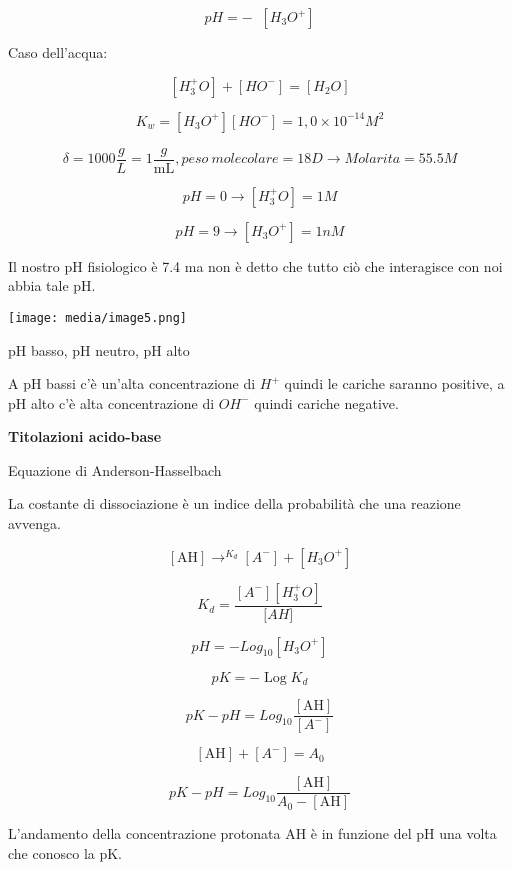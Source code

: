 \[pH = - \operatorname{}\left\lbrack H_{3}O^{+} \right\rbrack\]

Caso dell'acqua:

\[\left\lbrack H_{3}^{+}O \right\rbrack + \left\lbrack HO^{-} \right\rbrack = \left\lbrack H_{2}O \right\rbrack\]

\[K_{w} = \left\lbrack H_{3}O^{+} \right\rbrack\left\lbrack HO^{-} \right\rbrack = 1,0 \times 10^{- 14}M^{2}\]

\[\delta = 1000\frac{g}{L} = 1\frac{g}{\text{mL}},peso\ molecolare = 18D \rightarrow Molarita = 55.5M\]

\[pH = 0 \rightarrow \left\lbrack H_{3}^{+}O \right\rbrack = 1M\]

\[pH = 9 \rightarrow \left\lbrack H_{3}O^{+} \right\rbrack = 1nM\]

Il nostro pH fisiologico è 7.4 ma non è detto che tutto ciò che
interagisce con noi abbia tale pH.

\texttt{[image: media/image5.png]}

pH basso, pH neutro, pH alto

A pH bassi c'è un'alta concentrazione di \(H^{+}\) quindi le cariche
saranno positive, a pH alto c'è alta concentrazione di \(OH^{-}\) quindi
cariche negative.

\textbf{Titolazioni acido-base}

Equazione di Anderson-Hasselbach

La costante di dissociazione è un indice della probabilità che una
reazione avvenga.

\[\left\lbrack \text{AH} \right\rbrack \rightarrow^{K_{d}}\left\lbrack A^{-} \right\rbrack + \left\lbrack H_{3}O^{+} \right\rbrack\]

\[K_{d} = \frac{\left\lbrack A^{-} \right\rbrack\left\lbrack H_{3}^{+}O \right\rbrack}{\lbrack AH\rbrack}\]

\[pH = - Log_{10}\left\lbrack H_{3}O^{+} \right\rbrack\]

\[pK = - \operatorname{Log}K_{d}\]

\[pK - pH = Log_{10}\frac{\left\lbrack \text{AH} \right\rbrack}{\left\lbrack A^{-} \right\rbrack}\]

\[\left\lbrack \text{AH} \right\rbrack + \left\lbrack A^{-} \right\rbrack = A_{0}\]

\[pK - pH = Log_{10}\frac{\left\lbrack \text{AH} \right\rbrack}{A_{0} - \left\lbrack \text{AH} \right\rbrack}\]

L'andamento della concentrazione protonata AH è in funzione del pH una
volta che conosco la pK.

